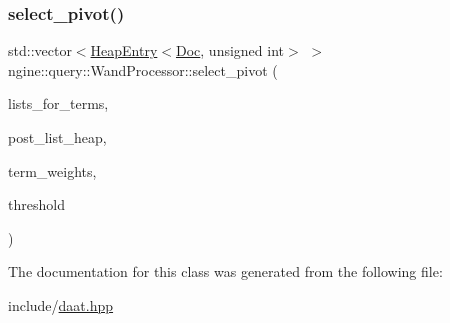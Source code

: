 \subsubsection{\texorpdfstring{select\+\_\+pivot()}{select\_pivot()}}
{\footnotesize\ttfamily std\+::vector$<$\hyperlink{structngine_1_1HeapEntry}{Heap\+Entry}$<$\hyperlink{structngine_1_1Doc}{Doc}, unsigned int$>$ $>$ ngine\+::query\+::\+Wand\+Processor\+::select\+\_\+pivot (\begin{DoxyParamCaption}\item[{const std\+::vector$<$ \hyperlink{classngine_1_1PostingList}{Posting\+List} $>$ \&}]{lists\+\_\+for\+\_\+terms,  }\item[{\hyperlink{classngine_1_1MinHeap}{Min\+Heap}$<$ \hyperlink{structngine_1_1Doc}{Doc}, unsigned int $>$ \&}]{post\+\_\+list\+\_\+heap,  }\item[{const std\+::vector$<$ \hyperlink{structngine_1_1Score}{Score} $>$ \&}]{term\+\_\+weights,  }\item[{const \hyperlink{structngine_1_1Score}{Score}}]{threshold }\end{DoxyParamCaption})\hspace{0.3cm}{\ttfamily [inline]}}



The documentation for this class was generated from the following file\+:\begin{DoxyCompactItemize}
\item 
include/\hyperlink{daat_8hpp}{daat.\+hpp}\end{DoxyCompactItemize}
